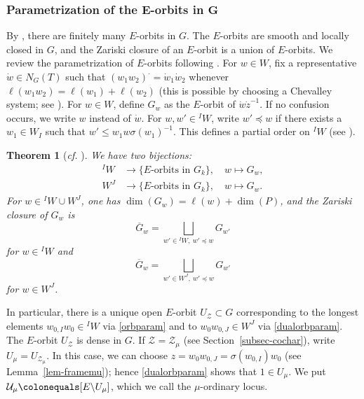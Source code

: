 \documentclass[11pt]{amsart}
\numberwithin{equation}{section}
\newtheorem{theorem}{Theorem}[section]
\theoremstyle{definition}
\theoremstyle{remark}
\newcommand{\Ucal}{{\mathcal U}}
\newcommand{\Zcal}{{\mathcal Z}}
\begin{document}
\subsubsection{Parametrization of the \texorpdfstring{$\boldsymbol{E}$}{E}-orbits in \texorpdfstring{$\boldsymbol{G}$}{G}}
\label{subsec-zipstrata}
By \cite[Proposition 7.1]{Pink-Wedhorn-Ziegler-zip-data}, there are finitely many $E$-orbits in $G$. The $E$-orbits are smooth and locally closed in $G$, and the Zariski closure of an $E$-orbit is a union of $E$-orbits. We review the parametrization of $E$-orbits following \cite{Pink-Wedhorn-Ziegler-zip-data}. For $w\in W$, fix a representative $\dot{w}\in N_G(T)$ such that $(w_1w_2)^\cdot = \dot{w}_1\dot{w}_2$ whenever $\ell(w_1 w_2)=\ell(w_1)+\ell(w_2)$ (this is possible by choosing a Chevalley system; see \cite[Section~XXIII.6]{SGA3}). For $w\in W$, define $G_w$ as the $E$-orbit of $\dot{w}\dot{z}^{-1}$. If no confusion occurs, we write $w$ instead of $\dot{w}$. For $w,w'\in {}^I W$, write $w'\preccurlyeq w$ if there exists a $w_1\in W_I$ such that $w'\leq w_1 w \sigma(w_1)^{-1}$. This defines a partial order on ${}^I W$ (see \cite[Corollary 6.3]{Pink-Wedhorn-Ziegler-zip-data}).

\begin{theorem}[\textit{cf.} {\cite[Theorems 7.5,~11.2,~11.3 and~11.5]{Pink-Wedhorn-Ziegler-zip-data}}] \label{thm-E-orb-param}
We have two bijections:
\begin{align} \label{orbparam}
{}^I W &\longrightarrow \{ \textrm{$E$-orbits in $G_k$} \}, \quad w\longmapsto G_w,  \\  
\label{dualorbparam} W^J &\longrightarrow \{ \textrm{$E$-orbits in $G_k$}\}, \quad  w\longmapsto G_w. 
\end{align}
For $w\in {}^I W\cup W^J$, one has $\dim(G_w)= \ell(w)+\dim(P)$, and the Zariski closure of $G_w$ is 
\begin{equation}\label{equ-closure-rel}
\overline{G}_w=\bigsqcup_{w'\in {}^IW,\  w'\preccurlyeq w} G_{w'}
\end{equation}
for $w\in {}^I W$ and 
\begin{equation}\label{equ-closure-relJ}
\overline{G}_w=\bigsqcup_{w'\in W^J,\  w'\preccurlyeq w} G_{w'}
\end{equation}
for $w\in W^J$.
\end{theorem}
In particular, there is a unique open $E$-orbit $U_\Zcal\subset G$ corresponding to the longest elements $w_{0,I}w_0\in {}^I W$ via \eqref{orbparam} and to $w_0w_{0,J}\in W^J$ via \eqref{dualorbparam}. The $E$-orbit $U_\Zcal$ is dense in $G$.  If $\Zcal=\Zcal_\mu$ (see Section~\ref{subsec-cochar}), write $U_\mu=U_{\Zcal_\mu}$. In this case, we can choose $z=w_{0}w_{0,J}=\sigma(w_{0,I})w_0$ (see Lemma~\ref{lem-framemu}); hence \eqref{dualorbparam} shows that $1\in U_\mu$.  We put $\Ucal_\mu \colonequals [E\backslash U_\mu]$, which we call the $\mu$-ordinary locus.
\end{document}
